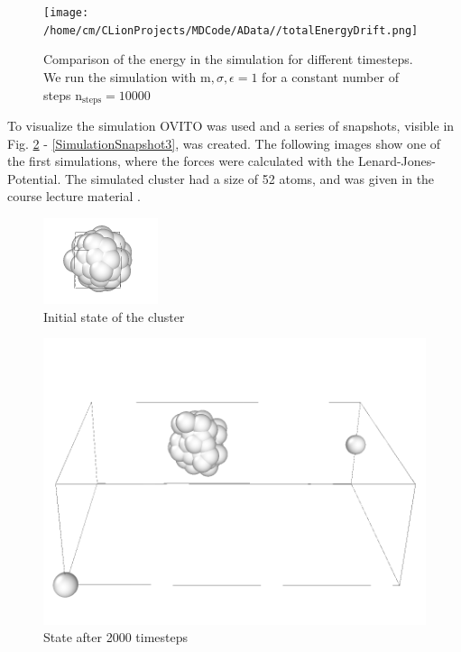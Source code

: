 \begin{figure}
	\begin{center}
		\texttt{[image: /home/cm/CLionProjects/MDCode/AData//totalEnergyDrift.png]}
	\end{center}
	\caption[Comparison of the energy in the simulation with different timesteps]{Comparison of the energy in the simulation for different timesteps. We run the simulation with $\mathrm{m}, \sigma, \epsilon = 1$ for a constant number of steps $\mathrm{n_{steps}} = 10000 $}
	\label{SimWithTimestep}
\end{figure}
\par
To visualize the simulation OVITO \cite{ovito} was used and a series of snapshots, visible in Fig. \ref{SimulationSnapshot1} - \ref{SimulationSnapshot3}, was created. The following images show one of the first simulations, where the forces were calculated with the Lenard-Jones-Potential. The simulated cluster had a size of 52 atoms, and was given in the course lecture material \cite{molDymCourse}.
\begin{figure}
	\begin{center}
		\includegraphics[scale= 0.65]{Figure/1ImageS.png}
	\end{center}
	\caption[Simulation Snapshot 1]{Initial state of the cluster}
	\label{SimulationSnapshot1}
\end{figure}

\begin{figure}
	\begin{center}
		\includegraphics[scale= 0.75]{Figure/2ImageS.png}
	\end{center}
	\caption[Simulation Snapshot 2]{State after 2000 timesteps}
	\label{SimulationSnapshot2}
\end{figure}

